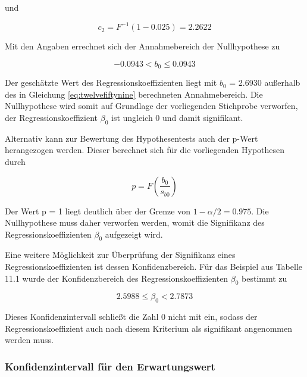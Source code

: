 \noindent und

\begin{equation}\label{eq:twelveeighty}
c_{2} =F^{-1} (1-0.025)= 2.2622
\end{equation}

\noindent Mit den Angaben errechnet sich der Annahmebereich der Nullhypothese zu

\begin{equation}\label{eq:twelveeightyone}
-0.0943 <b_{0} \le 0.0943
\end{equation}

\noindent Der gesch\"{a}tzte Wert des Regressionskoeffizienten liegt mit $b_{0}$ = 2.6930 au{\ss}erhalb des in Gleichung \eqref{eq:twelvefiftynine} berechneten Annahmebereich. Die Nullhypothese wird somit auf Grundlage der vorliegenden Stichprobe verworfen, der Regressionskoeffizient $\beta_{0}$ ist ungleich 0 und damit signifikant.\newline

\noindent Alternativ kann zur Bewertung des Hypothesentests auch der p-Wert herangezogen werden. Dieser berechnet sich f\"{u}r die vorliegenden Hypothesen durch

\begin{equation}\label{eq:twelveeightytwo}
p=F\left(\dfrac{b_{0}}{s_{b0}} \right)
\end{equation}

\noindent Der Wert p = 1 liegt deutlich \"{u}ber der Grenze von $1 - \alpha/2 = 0.975$. Die Nullhypothese muss daher verworfen werden, womit die Signifikanz des Regressionskoeffizienten $\beta_{0}$ aufgezeigt wird.\newline

\noindent Eine weitere M\"{o}glichkeit zur \"{U}berpr\"{u}fung der Signifikanz eines Regressionskoeffizienten ist dessen Konfidenzbereich. F\"{u}r das Beispiel aus Tabelle 11.1 wurde der Konfidenzbereich des Regressionskoeffizienten $\beta_{0}$ bestimmt zu 

\begin{equation}\label{eq:twelveeightythree}
2.5988 \le \beta _{0} <  2.7873
\end{equation}

\noindent Dieses Konfidenzintervall schlie{\ss}t die Zahl 0 nicht mit ein, sodass der Regressionskoeffizient auch nach diesem Kriterium als signifikant angenommen werden muss.

\clearpage

\subsubsection{Konfidenzintervall f\"{u}r den Erwartungswert}

